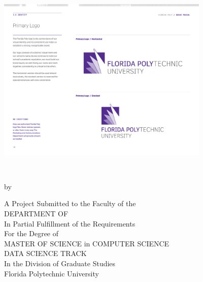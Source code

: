 %
%
%

\begin{center} 
    \includegraphics[width=4in]{Content/Images/FLPoly_logo.pdf}\\\vspace*{25mm}
	{{\bfseries\large{\MakeUppercase{\thesisTitle} \\}}\par}
	\vspace*{15mm}
	{by\\\vspace*{2mm}\textsc{\thesisBy}\par}
	\vspace*{15mm}
	A Project Submitted to the Faculty of the \\
	DEPARTMENT OF {\MakeUppercase{\thesisDegreeDepartment}}\\
	In Partial Fulfillment of the Requirements\\
	For the Degree of\\
	MASTER OF SCIENCE in COMPUTER SCIENCE\\
	DATA SCIENCE TRACK\\ 
	In the Division of Graduate Studies\\\vspace*{1.5mm}
	Florida Polytechnic University\\\vspace*{10mm}
	\small \thesisDate \\\vspace*{1.5mm}
	\vfill
    ~
\end{center}
\pagebreak